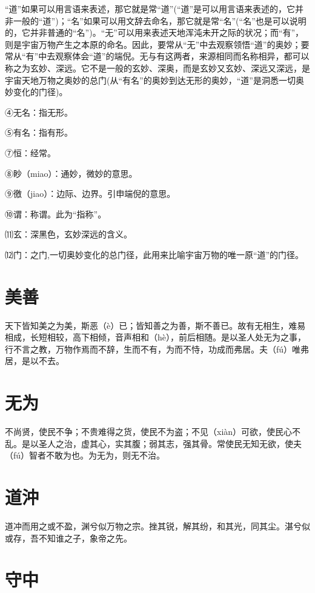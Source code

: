 \documentclass[a4paper,12pt,UTF8,twoside]{ctexbook}
\begin{document}
	
	
	
	
	“道”如果可以用言语来表述，那它就是常“道”(“道”是可以用言语来表述的，它并非一般的“道”)；“名”如果可以用文辞去命名，那它就是常“名”(“名”也是可以说明的，它并非普通的“名”)。“无”可以用来表述天地浑沌未开之际的状况；而“有”，则是宇宙万物产生之本原的命名。因此，要常从“无”中去观察领悟“道”的奥妙；要常从“有”中去观察体会“道”的端倪。无与有这两者，来源相同而名称相异，都可以称之为玄妙、深远。它不是一般的玄妙、深奥，而是玄妙又玄妙、深远又深远，是宇宙天地万物之奥妙的总门(从“有名”的奥妙到达无形的奥妙，“道”是洞悉一切奥妙变化的门径)。
	

	
	
	④无名：指无形。
	
	⑤有名：指有形。
	
	⑦恒：经常。
	
	⑧眇（miao）：通妙，微妙的意思。
	
	⑨徼（jiao）：边际、边界。引申端倪的意思。
	
	⑩谓：称谓。此为“指称”。
	
	⑾玄：深黑色，玄妙深远的含义。
	
	⑿门：之门,一切奥妙变化的总门径，此用来比喻宇宙万物的唯一原“道”的门径。
	
	\chapter{美善}
	
	天下皆知美之为美，斯恶（è）已；皆知善之为善，斯不善已。故有无相生，难易相成，长短相较，高下相倾，音声相和（hè），前后相随。是以圣人处无为之事，行不言之教，万物作焉而不辞，生而不有，为而不恃，功成而弗居。夫（fú）唯弗居，是以不去。
	
	\chapter{无为}
	
	不尚贤，使民不争；不贵难得之货，使民不为盗；不见（xiàn）可欲，使民心不乱。是以圣人之治，虚其心，实其腹；弱其志，强其骨。常使民无知无欲，使夫（fú）智者不敢为也。为无为，则无不治。
	
	\chapter{道沖}
	道冲而用之或不盈，渊兮似万物之宗。挫其锐，解其纷，和其光，同其尘。湛兮似或存，吾不知谁之子，象帝之先。
	
	
	\chapter{守中}
	
\end{document}
